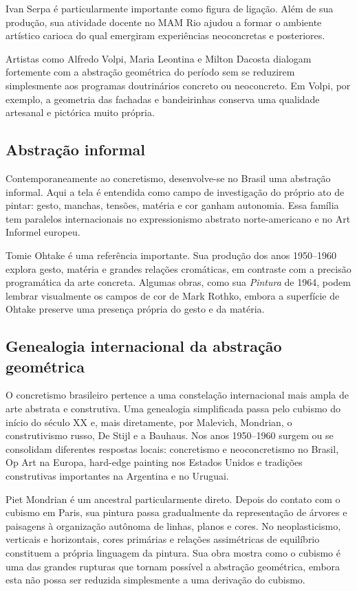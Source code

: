Ivan Serpa é particularmente importante como figura de ligação. Além de sua
produção, sua atividade docente no MAM Rio ajudou a formar o ambiente artístico
carioca do qual emergiram experiências neoconcretas e posteriores.

Artistas como Alfredo Volpi, Maria Leontina e Milton Dacosta dialogam fortemente
com a abstração geométrica do período sem se reduzirem simplesmente aos
programas doutrinários concreto ou neoconcreto. Em Volpi, por exemplo, a
geometria das fachadas e bandeirinhas conserva uma qualidade artesanal e
pictórica muito própria.

\subsection{Abstração informal}

Contemporaneamente ao concretismo, desenvolve-se no Brasil uma abstração
informal. Aqui a tela é entendida como campo de investigação do próprio ato de
pintar: gesto, manchas, tensões, matéria e cor ganham autonomia. Essa família
tem paralelos internacionais no expressionismo abstrato norte-americano e no
Art Informel europeu.

Tomie Ohtake é uma referência importante. Sua produção dos anos 1950--1960
explora gesto, matéria e grandes relações cromáticas, em contraste com a
precisão programática da arte concreta. Algumas obras, como sua \emph{Pintura}
de 1964, podem lembrar visualmente os campos de cor de Mark Rothko, embora a
superfície de Ohtake preserve uma presença própria do gesto e da matéria.

\subsection{Genealogia internacional da abstração geométrica}

O concretismo brasileiro pertence a uma constelação internacional mais ampla de
arte abstrata e construtiva. Uma genealogia simplificada passa pelo cubismo do
início do século XX e, mais diretamente, por Malevich, Mondrian, o
construtivismo russo, De Stijl e a Bauhaus. Nos anos 1950--1960 surgem ou se
consolidam diferentes respostas locais: concretismo e neoconcretismo no Brasil,
Op Art na Europa, hard-edge painting nos Estados Unidos e tradições
construtivas importantes na Argentina e no Uruguai.

Piet Mondrian é um ancestral particularmente direto. Depois do contato com o
cubismo em Paris, sua pintura passa gradualmente da representação de árvores e
paisagens à organização autônoma de linhas, planos e cores. No neoplasticismo,
verticais e horizontais, cores primárias e relações assimétricas de equilíbrio
constituem a própria linguagem da pintura. Sua obra mostra como o cubismo é uma
das grandes rupturas que tornam possível a abstração geométrica, embora esta
não possa ser reduzida simplesmente a uma derivação do cubismo.

